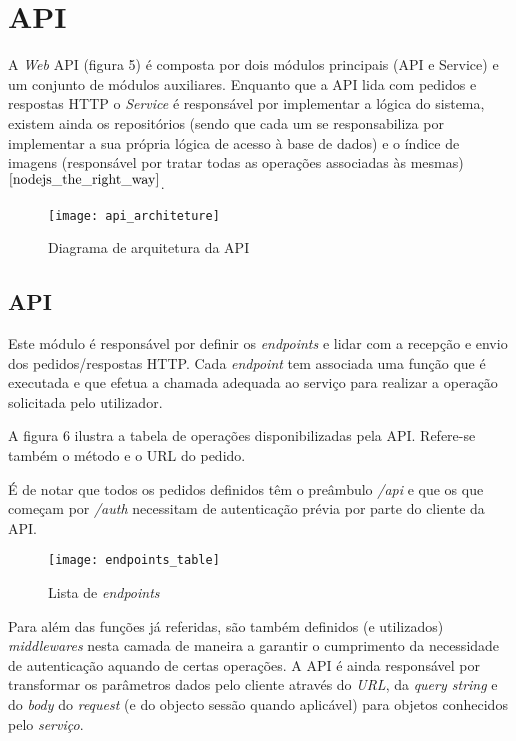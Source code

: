 \section{API}

A \textit{Web} API (figura 5) é composta por dois módulos principais (API e Service) e um conjunto de módulos auxiliares. Enquanto que a API lida com pedidos e respostas HTTP o \textit{Service} é responsável por implementar a lógica do sistema, existem ainda os repositórios (sendo que cada um se responsabiliza por implementar a sua própria lógica de acesso à base de dados) e o índice de imagens (responsável por tratar todas as operações associadas às mesmas)$^{\cite{nodejs_the_right_way}}$.\par \medskip

\begin{figure}[h]
	\centering
	\texttt{[image: api\_architeture]}
	\caption{Diagrama de arquitetura da API}
\end{figure}

\subsection{API}
Este módulo é responsável por definir os \textit{endpoints} e lidar com a recepção e envio dos pedidos/respostas HTTP. Cada \textit{endpoint} tem associada uma função que é executada e que efetua a chamada adequada ao serviço para realizar a operação solicitada pelo utilizador. \par \medskip

A figura 6 ilustra a tabela de operações disponibilizadas pela API. Refere-se também o método e o URL do pedido.	 \par \medskip

É de notar que todos os pedidos definidos têm o preâmbulo \textit{/api} e que os que começam por \textit{/auth} necessitam de autenticação prévia por parte do cliente da API. \par \medskip

\newpage

\begin{figure}[h]
	\centering
	\texttt{[image: endpoints\_table]}
	\caption{Lista de \textit{endpoints}}
\end{figure}

Para além das funções já referidas, são também definidos (e utilizados) \textit{middlewares} nesta camada de maneira a garantir o cumprimento da necessidade de autenticação aquando de certas operações. A API é ainda responsável por transformar os parâmetros dados pelo cliente através do \textit{URL}, da \textit{query string} e do \textit{body} do \textit{request} (e do objecto sessão quando aplicável) para objetos conhecidos pelo \textit{serviço}. \medskip

